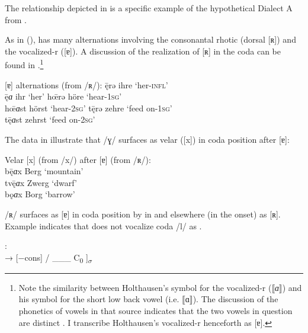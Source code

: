 The  relationship depicted in  is a specific example of the hypothetical Dialect A from .

As in  (),  has many alternations involving the consonantal rhotic (dorsal [ʀ]) and the vocalized-r ([ɐ]). A discussion of the realization of [ʀ] in the coda can be found in \citet[42]{Holthausen1886}.\footnote{{Note the similarity between Holthausen’s symbol for the vocalized-r (⟦}\textrm{\textit{ɑ}}\textrm{⟧) and his symbol for the short low back vowel (i.e. ⟦ɑ⟧). The discussion of the phonetics of vowels in that source indicates that the two vowels in question are distinct \citep[7]{Holthausen1886}. I transcribe Holthausen’s vocalized-r henceforth as [ɐ].}}

\ea%
  \relax [ʀ]{\textasciitilde}[ɐ] alternations (from /ʀ/):\label{ex:4:21}
\ea\label{ex:4:21a}   \={ę}rə            \tab [ɛːʀə]   \tab ihre   \tab ‘her-\textsc{infl}’    \\
      \={ę}\textit{ɑ}    \tab [ɛːɐ]    \tab ihr    \tab ‘her’                  
\ex\label{ex:4:21b}   h\={œ}rə           \tab [hœːʀə]  \tab höre   \tab ‘hear-\textsc{1sg}’    \\
      h\={œ}\textit{ɑ}st \tab [hœːɐst] \tab hörst  \tab ‘hear-\textsc{2sg}’    
\ex\label{ex:4:21c}   t\={ę}rə           \tab [tɛːʀə]  \tab zehre  \tab ‘feed on-\textsc{1sg}’ \\
      t\={ę}\textit{ɑ}st \tab [tɛːɐst] \tab zehrst \tab ‘feed on-\textsc{2sg}’ \\
  \z
\z 

The data in  illustrate that /ɣ/ surfaces as velar ([x]) in coda position after [ɐ]:

\ea%
  Velar [x] (from /x/) after [ɐ] (from /ʀ/):\\\label{ex:4:22}
b\={ę}\textit{ɑ}x  \tab [bɛːɐx]  \tab Berg  \tab ‘mountain’ \\
tv\={ę}\textit{ɑ}x \tab [tvɛːɐx] \tab Zwerg \tab ‘dwarf’    \\
bǫ\textit{ɑ}x      \tab [boːɐx]  \tab Borg  \tab ‘barrow’   
\z 

 /ʀ/ surfaces as [ɐ] in coda position by  in  and elsewhere (in the onset) as [ʀ]. Example  indicates that  does not vocalize coda /l/ as .

\ea%
    :\\\label{ex:4:23}
     → [−cons] / \_\_\_ C\textsubscript{0} ]\textsubscript{${\sigma}$}
\z 


